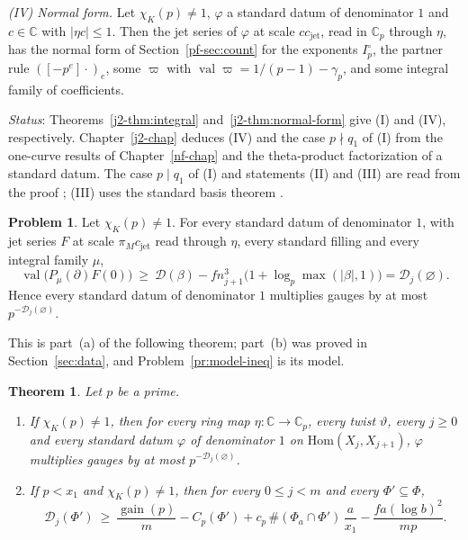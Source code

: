 \documentclass[reqno]{amsart}
\newcounter{chap}
\theoremstyle{plain}
\newtheorem{theorem}{Theorem}[section]
\theoremstyle{definition}
\newtheorem{problem}{Problem}[section]
\theoremstyle{remark}
\newcommand{\C}{{\mathbb{C}}}
\newcommand{\Dc}{\mathcal D}
\newcommand{\val}{\operatorname{val}}
\newcommand{\gain}{\operatorname{gain}}
\newcommand{\cjet}{c_{\mathrm{jet}}}
\begin{document}
\emph{(IV) Normal form.}  Let \(\chi_K(p) \ne 1\), \(\varphi\) a standard datum of denominator \(1\) and \(c \in \C\) with \(\lvert \eta c \rvert \le 1\).  Then the jet series of \(\varphi\) at scale \(c\cjet\), read in \(\C_p\) through \(\eta\), has the normal form of Section~\ref{pf-sec:count} for the exponents \(I_p^\circ\), the partner rule \(([-p^e]\cdot)_e\), some \(\varpi\) with \(\val \varpi = 1/(p-1) - \gamma_p\), and some integral family of coefficients.

\emph{Status}: Theorems~\ref{j2-thm:integral} and~\ref{j2-thm:normal-form} give (I) and (IV), respectively.  Chapter~\ref{j2-chap} deduces (IV) and the case \(p\nmid q_1\) of (I) from the one-curve results of Chapter~\ref{nf-chap} and the theta-product factorization of a standard datum.  The case \(p\mid q_1\) of (I) and statements (II) and (III) are read from the proof \cite{GL}; (III) uses the standard basis theorem \cite{DEP}.

\begin{problem}\label{pr:kernel-bound}
Let \(\chi_K(p) \ne 1\).  For every standard datum of denominator \(1\), with jet series \(F\) at scale \(\pi_M\cjet\) read through \(\eta\), every standard filling and every integral family \(\mu\),
\[
  \val\bigl(P_\mu(\partial)F(0)\bigr) \ \ge\ \Dc(\beta) - f n_{j+1}^3 \bigl(1 + \log_p \max(\lvert\beta\rvert, 1)\bigr) = \Dc_j(\varnothing) .
\]
Hence every standard datum of denominator \(1\) multiplies gauges by at most \(p^{-\Dc_j(\varnothing)}\).
\end{problem}

This is part~(a) of the following theorem; part~(b) was proved in Section~\ref{sec:data}, and Problem~\ref{pr:model-ineq} is its model.

\begin{theorem}\label{thm:stage}
Let \(p\) be a prime.
\begin{enumerate}
\item[(a)] If \(\chi_K(p) \ne 1\), then for every ring map \(\eta\colon \C \to \C_p\), every twist \(\vartheta\), every \(j \ge 0\) and every standard datum \(\varphi\) of denominator \(1\) on \(\mathrm{Hom}(X_j, X_{j+1})\), \(\varphi\) multiplies gauges by at most \(p^{-\Dc_j(\varnothing)}\).
\item[(b)] If \(p < x_1\) and \(\chi_K(p) \ne 1\), then for every \(0 \le j < m\) and every \(\Phi' \subseteq \Phi\),
\[
  \Dc_j(\Phi') \ \ge\ \frac{\gain(p)}{m} - C_p(\Phi') + c_p\, \#(\Phi_a \cap \Phi')\, \frac{a}{x_1} - \frac{fa(\log b)^2}{mp} .
\]
\end{enumerate}
\end{theorem}
\end{document}

